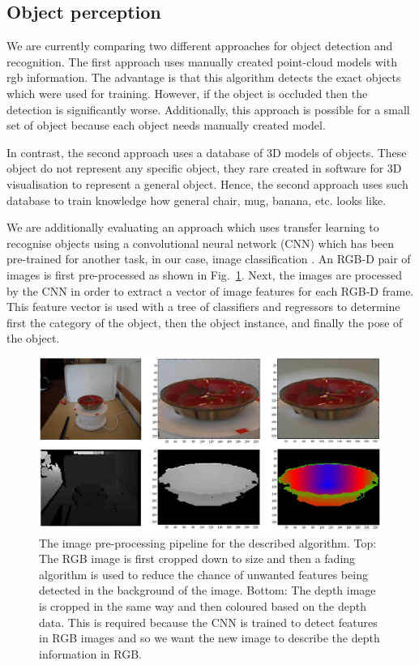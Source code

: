 \subsection{Object perception} 

We are currently comparing two different approaches for object detection and recognition. The first approach uses manually created point-cloud models with rgb information. 
The advantage is that this algorithm detects the exact objects which were used for training. 
However, if the object is occluded then the detection is significantly worse.
Additionally, this approach is possible for a small set of object because each object needs manually created model. 

In contrast, the second approach uses a database of 3D models of objects. These object do not represent any specific object, they rare created in software for 3D visualisation to represent a general object. 
Hence, the second approach uses such database to train knowledge how general chair, mug, banana, etc. looks like. 

We are additionally evaluating an approach which uses transfer learning to recognise objects using a convolutional neural network (CNN) which has been pre-trained for another task, in our case, image classification \cite{schwarz}. An RGB-D pair of images is first pre-processed as shown in Fig.~\ref{fig:object_perception}. Next, the images are processed by the CNN in order to extract a vector of image features for each RGB-D frame. This feature vector is used with a tree of classifiers and regressors to determine first the category of the object, then the object instance, and finally the pose of the object.

\begin{figure}[!htb]
\centering
\includegraphics[width=3.in]{object_perception.png}
\caption{The image pre-processing pipeline for the described algorithm. Top: The RGB image is first cropped down to size and then a fading algorithm is used to reduce the chance of unwanted features being detected in the background of the image. Bottom: The depth image is cropped in the same way and then coloured based on the depth data. This is required because the CNN is trained to detect features in RGB images and so we want the new image to describe the depth information in RGB.}
\label{fig:object_perception}
\end{figure}

